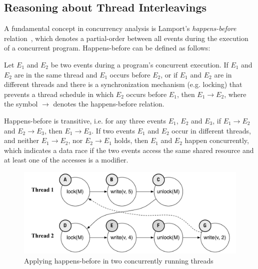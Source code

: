 \subsection{Reasoning about Thread Interleavings}
\label{bg:happensbefore}


A fundamental concept in concurrency analysis is Lamport's \emph{happens-before} relation~\cite{lamport1978time}, which denotes a partial-order between all events during the execution of a concurrent program. Happens-before can be defined as follows:

\begin{definition}
\label{definition:datarace}
Let $E_1$ and $E_2$ be two events during a program's concurrent execution. If $E_1$ and $E_2$ are in the same thread and $E_1$ occurs before $E_2$, or if $E_1$ and $E_2$ are in different threads and there is a synchronization mechanism (e.g. locking) that prevents a thread schedule in which $E_2$ occurs before $E_1$, then $E_1 \rightarrow E_2$, where the symbol $\rightarrow$ denotes the happens-before relation.
\end{definition}

Happens-before is transitive, i.e. for any three events $E_1$, $E_2$ and $E_3$, if $E_1 \rightarrow E_2$ and $E_2 \rightarrow E_3$, then $E_1 \rightarrow E_3$. If two events $E_1$ and $E_2$ occur in different threads, and neither $E_1 \rightarrow E_2$, nor $E_2 \rightarrow E_1$ holds, then $E_1$ and $E_2$ happen concurrently, which indicates a data race if the two events access the same shared resource and at least one of the accesses is a modifier.

\begin{figure}[htbp]
\centering
\includegraphics[width=1\linewidth]{img/happens_before.pdf}
\caption{Applying happens-before in two concurrently running threads}
\label{fig:happens_before}
\end{figure}

